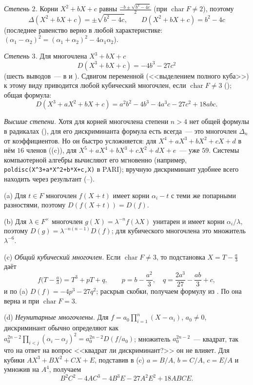 \begin{example}[4.2a]
\emph{Степень $2$.} Корни $X^2+bX+c$ равны $\frac{-b\pm\sqrt{b^2-4c}}2$ (при $\operatorname{char}F\ne2$), поэтому
\[
\Delta(X^2+bX+c)=\pm\sqrt{b^2-4c},\qquad D(X^2+bX+c)=b^2-4c
\]
(последнее равенство верно в любой характеристике: $(\alpha_1-\alpha_2)^2=(\alpha_1+\alpha_2)^2-4\alpha_1\alpha_2$).

\emph{Степень $3$.} Для многочлена $X^3+bX+c$
\[
D(X^3+bX+c)=-4b^3-27c^2
\]
(шесть выводов~--- в  и ). Сдвигом переменной (<<выделением полного куба>>) к этому виду приводится
любой кубический многочлен, если $\operatorname{char}F\ne3$ (); общая формула:
\[
D(X^3+aX^2+bX+c)=a^2b^2-4b^3-4a^3c-27c^2+18abc .
\]

\emph{Высшие степени.} Хотя для корней многочлена степени $n>4$ нет общей формулы в радикалах (), для его
дискриминанта формула есть всегда~--- это многочлен $\Delta_n$ от коэффициентов. Но он быстро усложняется: для
$X^4+aX^3+bX^2+cX+d$ в нём $16$ членов ((c)), для $X^5+aX^4+bX^3+cX^2+dX+e$~--- уже $59$. Системы компьютерной
алгебры вычисляют его мгновенно (например, \texttt{poldisc(X\^{}3+a*X\^{}2+b*X+c,X)} в PARI); вручную дискриминант
удобнее всего находить через результант (--).
\end{example}

\begin{remark}
(a) Для $t\in F$ многочлен $f(X+t)$ имеет корни $\alpha_i-t$ с теми же попарными разностями, поэтому
$D(f(X+t))=D(f)$.

(b) Для $\lambda\in F^\times$ многочлен $g(X)=\lambda^{-n}f(\lambda X)$ унитарен и имеет корни $\alpha_i/\lambda$, поэтому
$D(g)=\lambda^{-n(n-1)}D(f)$; для кубического многочлена это множитель $\lambda^{-6}$.

(c) \emph{Общий кубический многочлен.} Если $\operatorname{char}F\ne3$, то подстановка $X=T-\frac a3$ даёт
\[
f\bigl(T-\tfrac a3\bigr)=T^3+pT+q,\qquad p=b-\frac{a^2}3,\quad q=\frac{2a^3}{27}-\frac{ab}3+c,
\]
и по (a) $D(f)=-4p^3-27q^2$; раскрыв скобки, получаем формулу из . По  она верна и при
$\operatorname{char}F=3$.

(d) \emph{Неунитарные многочлены.} Для $f=a_0\prod_{i=1}^n(X-\alpha_i)$, $a_0\ne0$, дискриминант обычно определяют как
$a_0^{2n-2}\prod_{i<j}(\alpha_i-\alpha_j)^2=a_0^{2n-2}D(f/a_0)$; множитель $a_0^{2n-2}$~--- квадрат, так что на ответ на вопрос
<<квадрат ли дискриминант?>> он не влияет.
Для кубики $AX^3+BX^2+CX+E$, подставив в (c) $a=B/A$, $b=C/A$, $c=E/A$ и умножив на $A^4$, получаем
\[
B^2C^2-4AC^3-4B^3E-27A^2E^2+18ABCE .
\]
\end{remark}

